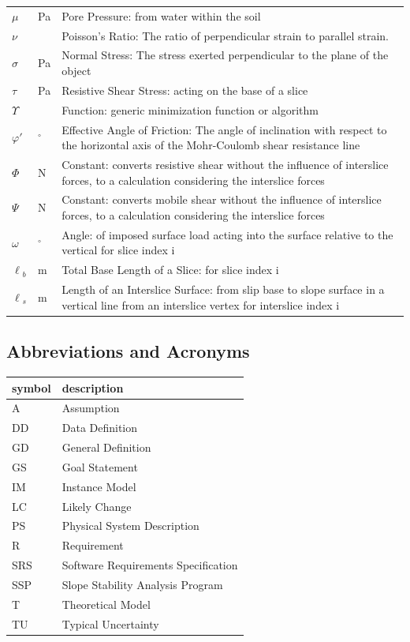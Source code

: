 \documentclass[12pt]{article}
\newcommand{\progname}{SSP}
\renewcommand{\arraystretch}{1}
\begin{document}
\begin{longtable}{  l  l  p{8.5cm}  }
\\
$\mu{}$ &\si{\pascal} & Pore Pressure: from water within the soil
\\
$\nu{}$ & & Poisson's Ratio: The ratio of perpendicular strain to parallel strain. 
\\
$\sigma{}$ & \si{\pascal} &Normal Stress: The stress exerted perpendicular to the plane of the object
\\
$\tau{}$ & \si{\pascal} & Resistive Shear Stress: acting on the base of a slice
\\
$\Upsilon{}$ & & Function: generic minimization function or algorithm 
\\
$\varphi{}'$ & ${}^{\circ}$ &Effective Angle of Friction: The angle of inclination with respect to the horizontal axis of the Mohr-Coulomb shear resistance line
\\
$\Phi{}$ & \si{\newton} & Constant: converts resistive shear without the influence of interslice forces, to a calculation considering the interslice forces
\\
$\Psi{}$ & \si{\newton} & Constant: converts mobile shear without the influence of interslice forces, to a calculation considering the interslice forces
\\
$\omega{}$ & ${}^{\circ}$ & Angle: of imposed surface load acting into the surface relative to the vertical for slice index i
\\
${\ell{}_{b}}$ &  \si{\meter}& Total Base Length of a Slice: for slice index i
\\
${\ell{}_{s}}$ &  \si{\meter}& Length of an Interslice Surface: from slip base to slope surface in a vertical line from an interslice vertex for interslice index i \\

\hline
\end{longtable}
\renewcommand{\arraystretch}{1}


\subsection{Abbreviations and Acronyms}

\renewcommand{\arraystretch}{1.2}
\begin{tabular}{l l} 
  \toprule		
  \textbf{symbol} & \textbf{description}\\
  \midrule 
  A & Assumption\\
  DD & Data Definition\\
  GD & General Definition\\
  GS & Goal Statement\\
  IM & Instance Model\\
  LC & Likely Change\\
  PS & Physical System Description\\
  R & Requirement\\
  SRS & Software Requirements Specification\\
  \progname\ & Slope Stability Analysis Program\\
  T & Theoretical Model\\
TU & Typical Uncertainty
\\
  \bottomrule
\end{tabular}\\
\end{document}
